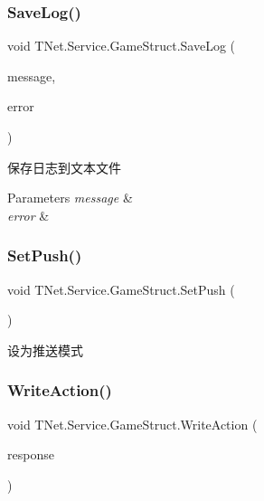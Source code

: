 \subsubsection{\texorpdfstring{Save\+Log()}{SaveLog()}\hspace{0.1cm}{\footnotesize\ttfamily [3/3]}}
{\footnotesize\ttfamily void T\+Net.\+Service.\+Game\+Struct.\+Save\+Log (\begin{DoxyParamCaption}\item[{String}]{message,  }\item[{Exception}]{error }\end{DoxyParamCaption})\hspace{0.3cm}{\ttfamily [protected]}}



保存日志到文本文件 


\begin{DoxyParams}{Parameters}
{\em message} & \\
\hline
{\em error} & \\
\hline
\end{DoxyParams}
\mbox{\label{class_t_net_1_1_service_1_1_game_struct_a0d368920d892f3948113651765bbefc4}} 
\subsubsection{\texorpdfstring{Set\+Push()}{SetPush()}}
{\footnotesize\ttfamily void T\+Net.\+Service.\+Game\+Struct.\+Set\+Push (\begin{DoxyParamCaption}{ }\end{DoxyParamCaption})}



设为推送模式 

\mbox{\label{class_t_net_1_1_service_1_1_game_struct_ab5b7f1b800711d181a76b1497b5e21da}} 
\subsubsection{\texorpdfstring{Write\+Action()}{WriteAction()}}
{\footnotesize\ttfamily void T\+Net.\+Service.\+Game\+Struct.\+Write\+Action (\begin{DoxyParamCaption}\item[{\mbox{\hyperlink{class_t_net_1_1_service_1_1_base_game_response}{Base\+Game\+Response}}}]{response }\end{DoxyParamCaption})}



